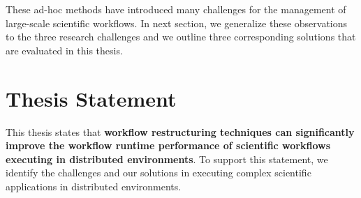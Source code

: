 These ad-hoc methods have introduced many challenges for the management of large-scale scientific workflows. In next section, we generalize these observations to the three research challenges and we outline three corresponding solutions that are evaluated in this thesis. 

\section{Thesis Statement}
This thesis states that \textbf{workflow restructuring techniques can significantly improve the workflow runtime performance of scientific workflows executing in distributed environments}. 
To support this statement, we identify the challenges and our solutions in executing complex scientific applications in distributed environments. 




